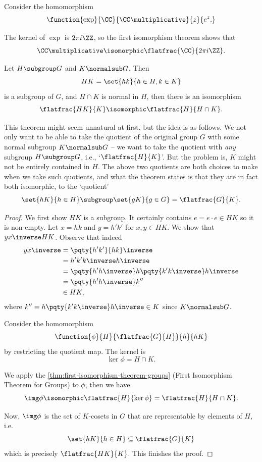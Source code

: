 \begin{example*}
    Consider the homomorphism
    \[
        \function{\exp}{\CC}{\CC\multiplicative}{z}{e^z.}
    \]
    
    The kernel of \(\exp\) is \(2\pi i \ZZ\), so the first isomorphism theorem shows that
    \[
        \CC\multiplicative \isomorphic \flatfrac{\CC}{2\pi i \ZZ}.
    \]
\end{example*}

\begin{theorem}
    \label{thm:second-isomorphism-theorem-groups}%
    Let \(H \subgroup G\) and \(K \normalsub G\). Then
    \[
        HK = \set{hk}{h \in H, k \in K}
    \]
    is a subgroup of \(G\), and \(H \cap K\) is normal in \(H\), then there is an isomorphism
    \[
        \flatfrac{HK}{K} \isomorphic \flatfrac{H}{H \cap K}.
    \]
\end{theorem}

This theorem might seem unnatural at first, but the idea is as follows. We not only want to be able to take the quotient of the original group \(G\) with some normal subgroup \(K \normalsub G\) -- we want to take the quotient with \emph{any} subgroup \(H \subgroup G\), i.e., `\(\flatfrac{H}{K}\)'. But the problem is, \(K\) might not be entirely contained in \(H\). The above two quotients are both choices to make when we take such quotients, and what the theorem states is that they are in fact both isomorphic, to the `quotient'
\[
    \set{hK}{h \in H} \subgroup \set{gK}{g \in G} = \flatfrac{G}{K}.
\]

\begin{proof}
    We first show \(HK\) is a subgroup. It certainly contains \(e = e \cdot e \in HK\) so it is non-empty. Let \(x = hk\) and \(y = h' k'\) for \(x, y \in HK\). We show that \(y x \inverse HK\). Observe that indeed
    \begin{align*}
        y x \inverse &= \pqty{h' k'}{h k}\inverse \\
        &= h' k' k \inverse h\inverse \\
        &= \pqty{h' h\inverse} h \pqty{k' k\inverse} h\inverse \\
        &= \pqty{h' h\inverse} k'' \\
        &\in HK,
    \end{align*}
    where \(k'' = h \pqty{k' k\inverse} h\inverse \in K\) since \(K \normalsub G\).

    Consider the homomorphism
    \[
        \function{\phi}{H}{\flatfrac{G}{H}}{h}{hK}
    \]
    by restricting the quotient map. The kernel is
    \[
        \ker \phi = H \cap K.
    \]

    We apply the \autoref{thm:first-isomorphism-theorem-groups} (First Isomorphism Theorem for Groups) to \(\phi\), then we have
    \[
        \img \phi \isomorphic \flatfrac{H}{\ker \phi} = \flatfrac{H}{H \cap K}.
    \]

    Now, \(\img \phi\) is the set of \(K\)-cosets in \(G\) that are representable by elements of \(H\), i.e.
    \[
        \set{hK}{h \in H} \subseteq \flatfrac{G}{K}
    \]
    which is precisely \(\flatfrac{HK}{K}\). This finishes the proof.
\end{proof}

